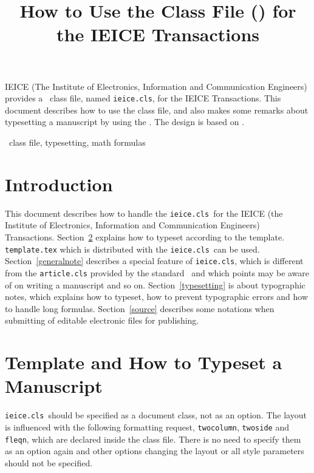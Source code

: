 \documentclass[paper]{ieice}
\title[How to Use the Class File (\ClassFile)]
      {How to Use the Class File (\ClassFile) for the IEICE Transactions}
\def\ClassFile{\texttt{ieice.cls}}
\begin{document}
\maketitle

\begin{summary}
IEICE (The Institute of Electronics, Information and Communication Engineers) 
provides a \LaTeXe\ class file, named \ClassFile, 
for the IEICE Transactions. This document describes how to use 
the class file, and also makes some remarks about typesetting 
a manuscript by using the \LaTeXe. The design is based on \LaTeXe.
\end{summary}
\begin{keywords}
\LaTeXe\ class file, typesetting, math formulas
\end{keywords}

\section{Introduction}\label{intro}

This document describes how to handle the \ClassFile\ 
for the IEICE (the Institute of Electronics, Information 
and Communication Engineers) Transactions. 
Section~\ref{usage} explains how to typeset according to the template. 
\texttt{template.tex} which is distributed with the \ClassFile\ can be used. 
Section~\ref{generalnote} describes a special feature of \ClassFile, 
which is different from the \texttt{article.cls} provided 
by the standard \LaTeXe\ and which points may be aware of 
on writing a manuscript and so on. Section~\ref{typesetting} is 
about typographic notes, 
which explains how to typeset, how to prevent typographic errors 
and how to handle long formulas. 
Section~\ref{source} describes some notations 
when submitting of editable electronic files for publishing. 

\section{Template and How to Typeset a Manuscript}
\label{usage}

\ClassFile\ should be specified as a document class, not as an option.
The layout is influenced with the following formatting request, 
\texttt{twocolumn}, \texttt{twoside} and \texttt{fleqn}, 
which are declared inside the class file. 
There is no need to specify them as an option again 
and other options changing the layout or all style parameters 
should not be specified. 
\end{document}
